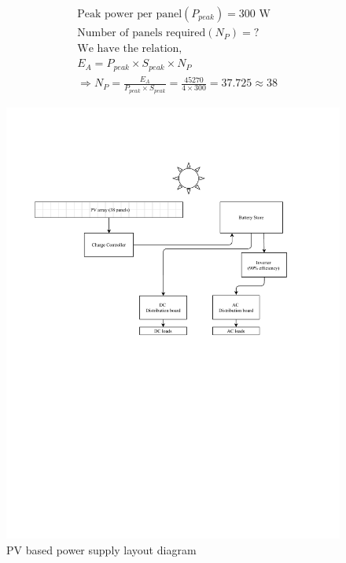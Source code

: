 \documentclass{home_assignment}
\begin{document}
\begin{fleqn}[\parindent]
    \begin{equation*}
       \begin{split}
        &\text{Peak power per panel} (P_{peak})= 300 \text{ W}\\
        &\text{Number of panels required} (N_P)= \text{?}\\
        &\text{We have the relation,}\\
        &E_A=P_{peak}\times S_{peak}\times N_P\\
        &\Rightarrow N_P=\frac{E_A}{P_{peak}\times S_{peak}}=\frac{45270}{4\times 300}=37.725\approx 38
         \end{split}
       \end{equation*}
\end{fleqn}
\begin{figure}[H]
    \centering
    \includegraphics[width=\linewidth]{layout.pdf}
    \caption{PV based power supply layout diagram}
\end{figure}
\end{document}
